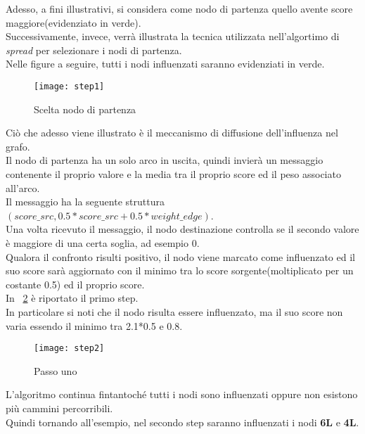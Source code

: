 \clearpage

Adesso, a fini illustrativi, si considera come nodo di partenza quello avente
score maggiore(evidenziato in verde).\\
Successivamente, invece, verrà illustrata la tecnica utilizzata nell'algortimo di \textit{spread}
per selezionare i nodi di partenza.\\
Nelle figure a seguire, tutti i nodi influenzati saranno evidenziati in verde.
\begin{figure}[!htbp]
  \begin{center}
    \texttt{[image: step1]}
  	\caption{Scelta nodo di partenza}
  	\label{step1}
  \end{center}
\end{figure}
\clearpage
Ciò che adesso viene illustrato è il meccanismo di diffusione dell'influenza nel
grafo.\\
Il nodo di partenza ha un solo arco in uscita, quindi invierà un messaggio contenente il proprio valore e
la media tra il proprio score ed il peso associato all'arco.\\
Il messaggio ha la seguente struttura $(score\_src, 0.5*score\_src+0.5*weight\_edge)$.\\
Una volta ricevuto il messaggio, il nodo destinazione controlla se il secondo valore è maggiore di una certa soglia,
ad esempio 0.\\
Qualora il confronto risulti positivo, il nodo viene marcato come influenzato ed il
suo score sarà aggiornato con il minimo tra lo score sorgente(moltiplicato per un costante 0.5) ed il proprio score.\\
In \figurename~\ref{step2} è riportato il primo step.\\In particolare si noti che il nodo
risulta essere influenzato, ma il suo score non varia essendo il minimo tra 2.1*0.5 e 0.8.

\begin{figure}[!htbp]
  \begin{center}
    \texttt{[image: step2]}
  	\caption{Passo uno}
  	\label{step2}
  \end{center}
\end{figure}
\clearpage
L'algoritmo continua fintantoché tutti i nodi sono influenzati oppure non esistono più cammini percorribili.\\
Quindi tornando all'esempio, nel secondo step saranno influenzati i nodi \textbf{6L} e \textbf{4L}.

